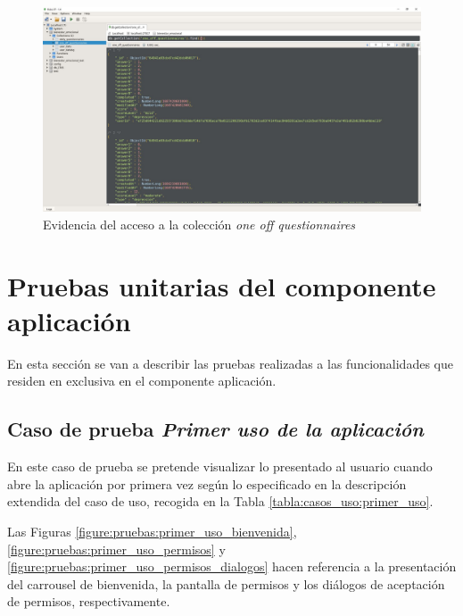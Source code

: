             \begin{figure}[h]
                \centering
                \includegraphics[width=1\textwidth]{figures/pruebas/robo3t_one_off.JPG}
                \caption{Evidencia del acceso a la colección \textit{one off questionnaires}}
                \label{figure:pruebas:visualizacion_general_one_off}
            \end{figure}

            \clearpage  %
    
    \section{Pruebas unitarias del componente aplicación}
    
        En esta sección se van a describir las pruebas realizadas a las funcionalidades que residen en exclusiva en el componente aplicación.

        \subsection*{Caso de prueba \textit{Primer uso de la aplicación}} 
            En este caso de prueba se pretende visualizar lo presentado al usuario cuando abre la aplicación por primera vez según lo especificado en la descripción extendida del caso de uso, recogida en la Tabla \ref{tabla:casos_uso:primer_uso}.

            Las Figuras \ref{figure:pruebas:primer_uso_bienvenida}, \ref{figure:pruebas:primer_uso_permisos} y \ref{figure:pruebas:primer_uso_permisos_dialogos} hacen referencia a la presentación del carrousel de bienvenida, la pantalla de permisos y los diálogos de aceptación de permisos, respectivamente.

